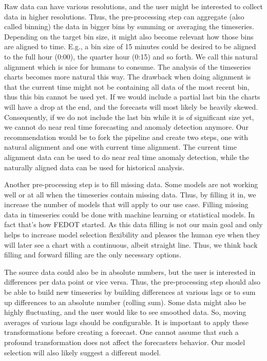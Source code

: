 Raw data can have various resolutions, and the user might be interested to collect data in higher resolutions. Thus, the pre-processing step can aggregate (also called binning) the data in bigger bins by summing or averaging the timeseries. Depending on the target bin size, it might also become relevant how those bins are aligned to time. E.g., a bin size of 15 minutes could be desired to be aligned to the full hour (0:00), the quarter hour (0:15) and so forth. We call this natural alignment which is nice for humans to consume. The analysis of the timeseries charts becomes more natural this way. The drawback when doing alignment is that the current time might not be containing all data of the most recent bin, thus this bin cannot be used yet. If we would include a partial last bin the charts will have a drop at the end, and the forecasts will most likely be heavily skewed. Consequently, if we do not include the last bin while it is of significant size yet, we cannot do near real time forecasting and anomaly detection anymore. Our recommendation would be to fork the pipeline and create two steps, one with natural alignment and one with current time alignment. The current time alignment data can be used to do near real time anomaly detection, while the naturally aligned data can be used for historical analysis.

Another pre-processing step is to fill missing data. Some models are not working well or at all when the timeseries contain missing data. Thus, by filling it in, we increase the number of models that will apply to our use case. Filling missing data in timeseries could be done with machine learning or statistical models. In fact that's how FEDOT \cite{fedot} started. As this data filling is not our main goal and only helps to increase model selection flexibility and pleases the human eye when they will later see a chart with a continuous, albeit straight line. Thus, we think back filling and forward filling are the only necessary options.

The source data could also be in absolute numbers, but the user is interested in differences per data point or vice versa. Thus, the pre-processing step should also be able to build new timeseries by building differences at various lags or to sum up differences to an absolute number (rolling sum). Some data might also be highly fluctuating, and the user would like to see smoothed data. So, moving averages of various lags should be configurable. It is important to apply these transformations before creating a forecast. One cannot assume that such a profound transformation does not affect the forecasters behavior. Our model selection will also likely suggest a different model.

